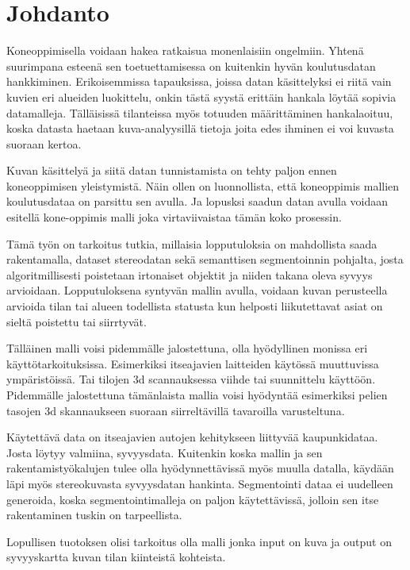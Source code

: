 \chapter{Johdanto}%
\label{ch:johdanto}


Koneoppimisella voidaan hakea ratkaisua monenlaisiin ongelmiin. Yhtenä suurimpana esteenä sen toetuettamisessa on kuitenkin hyvän koulutusdatan hankkiminen. Erikoisemmissa tapauksissa, joissa datan käsittelyksi ei riitä vain kuvien eri alueiden luokittelu, onkin tästä syystä erittäin hankala löytää sopivia datamalleja. Tälläisissä tilanteissa myös totuuden määrittäminen hankalaoituu, koska datasta haetaan kuva-analyysillä tietoja joita edes ihminen ei voi kuvasta suoraan kertoa.

Kuvan käsittelyä ja siitä datan tunnistamista on tehty paljon ennen koneoppimisen yleistymistä. Näin ollen on luonnollista, että koneoppimis mallien koulutusdataa on parsittu sen avulla. Ja lopusksi saadun datan avulla voidaan esitellä kone-oppimis malli joka virtaviivaistaa tämän koko prosessin.

Tämä työn on tarkoitus tutkia, millaisia lopputuloksia on mahdollista saada rakentamalla, dataset stereodatan sekä semanttisen segmentoinnin pohjalta, josta algoritmillisesti poistetaan irtonaiset objektit ja niiden takana oleva syvyys arvioidaan. Lopputuloksena syntyvän mallin avulla, voidaan kuvan perusteella arvioida tilan tai alueen todellista statusta kun helposti liikutettavat asiat on sieltä poistettu tai siirrtyvät.

Tälläinen malli voisi pidemmälle jalostettuna, olla hyödyllinen monissa eri käyttötarkoituksissa. Esimerkiksi itseajavien laitteiden käytössä muuttuvissa ympäristöissä. Tai tilojen 3d scannauksessa viihde tai suunnittelu käyttöön. Pidemmälle jalostettuna tämänlaista mallia voisi hyödyntää esimerkiksi pelien tasojen 3d skannaukseen suoraan siirreltävillä tavaroilla varusteltuna.

Käytettävä data on itseajavien autojen kehitykseen liittyvää kaupunkidataa. Josta löytyy valmiina, syvyysdata. Kuitenkin koska mallin ja sen rakentamistyökalujen tulee olla hyödynnettävissä myös muulla datalla, käydään läpi myös stereokuvasta syvyysdatan hankinta. Segmentointi dataa ei uudelleen generoida, koska segmentointimalleja on paljon käytettävissä, jolloin sen itse rakentaminen tuskin on tarpeellista.

Lopullisen tuotoksen olisi tarkoitus olla malli jonka input on kuva ja output on syvyyskartta kuvan tilan kiinteistä kohteista.
